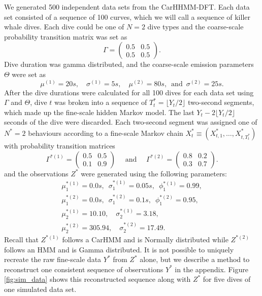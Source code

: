 We generated 500 independent data sets from the CarHHMM-DFT. Each data set consisted of a sequence of 100 curves, which we will call a sequence of killer whale dives. Each dive could be one of $N=2$ dive types and the coarse-scale probability transition matrix was set as
%
$$\Gamma = \begin{pmatrix} 0.5 & 0.5 \\ 0.5 & 0.5 \end{pmatrix}.$$
%
Dive duration was gamma distributed, and the coarse-scale emission parameters $\Theta$ were set as
$$
    \mu^{(1)} = 20s, \quad \sigma^{(1)} = 5s, \quad
    \mu^{(2)} = 80s, \enspace \text{and} \enspace \sigma^{(2)} = 25s.
$$
%
After the dive durations were calculated for all 100 dives for each data set using $\Gamma$ and $\Theta$, dive $t$ was broken into a sequence of $T^*_t = \lfloor Y_t/2 \rfloor$ two-second segments, which made up the fine-scale hidden Markov model. The last $Y_t - 2\lfloor Y_t/2 \rfloor$ seconds of the dive were discarded. Each two-second segment was assigned one of $N^*=2$ behaviours according to a fine-scale Markov chain $X^*_t \equiv \left(X^*_{t,1}, \ldots, X^*_{t,T^*_t} \right)$ with probability transition matrices
%
$$\Gamma^{*(1)} = \begin{pmatrix} 0.5 & 0.5 \\ 0.1 & 0.9 \end{pmatrix} \quad \text{ and } \quad \Gamma^{*(2)} = \begin{pmatrix} 0.8 & 0.2 \\ 0.3 & 0.7 \end{pmatrix}.$$ 
%
and the observations $Z^*$ were generated using the following parameters:
%
\begin{gather*}
    \mu_1^{*(1)} = 0.0 s, \enspace \sigma_1^{*(1)} = 0.05s, \enspace \phi_1^{*(1)} = 0.99, \\
    \mu_1^{*(2)} = 0.0 s, \enspace \sigma_1^{*(2)} = 0.1s, \enspace \phi_1^{*(2)} = 0.95, \\
    \mu_2^{*(1)} = 10.10, \quad \sigma_2^{*(1)} = 3.18, \\
    \mu_2^{*(2)} = 305.94, \quad \sigma_2^{*(2)} = 17.49.
\end{gather*}
%
Recall that $Z^{*(1)}$ follows a CarHMM and is Normally distributed while $Z^{*(2)}$ follows an HMM and is Gamma distributed. It is not possible to uniquely recreate the raw fine-scale data $Y^*$ from $Z^*$ alone, but we describe a method to reconstruct one consistent sequence of observations $Y^*$ in the appendix. Figure \ref{fig:sim_data} shows this reconstructed sequence along with $Z^*$ for five dives of one simulated data set.

